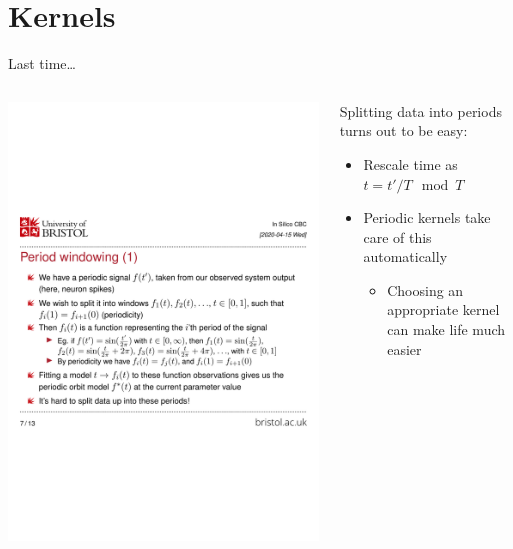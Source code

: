 \documentclass[presentation]{beamer}
\begin{document}
\section{Kernels}
\label{sec:org31d5929}
\begin{frame}[label={sec:org8a6519f}]{Last time\ldots{}}
\begin{columns}
\begin{column}{0.6\columnwidth}
\begin{center}
\includegraphics[trim={0cm 10cm 0cm 10cm},width=.9\linewidth]{./slide.pdf}
\end{center}
\end{column}

\begin{column}{0.4\columnwidth}
Splitting data into periods turns out to be easy:

\begin{itemize}
\item Rescale time as \(t = t' / T \mod T\)
\item Periodic kernels take care of this automatically
\begin{itemize}
\item Choosing an appropriate kernel can make life much easier
\end{itemize}
\end{itemize}
\end{column}
\end{columns}
\end{frame}
\end{document}
